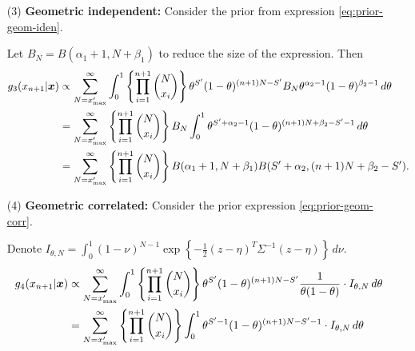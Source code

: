 {{\begin{enumerate}
        \item[(3)] {\bf Geometric independent:} Consider the prior from
        expression \ref{eq:prior-geom-iden}. 

        Let $B_N = B(\alpha_1+1,N+\beta_1)$ to reduce the size of the
        expression. Then
        \begin{equation*}
            \begin{split}
                g_3(x_{n+1}|\boldsymbol{x}) &\propto \sum_{N=x'_{\max}}^{\infty} \int_0^1 \left\{\prod_{i=1}^{n+1}\binom{N}{x_i}\right\}\theta^{S'}(1-\theta)^{(n+1)N-S'}B_N\theta^{\alpha_2-1}(1-\theta)^{\beta_2-1} \,d\theta \\
                &= \sum_{N=x'_{\max}}^{\infty} \left\{\prod_{i=1}^{n+1}\binom{N}{x_i}\right\}  B_N \int_0^1 \theta^{S'+\alpha_2-1}(1-\theta)^{(n+1)N+\beta_2-S'-1} \, d\theta \\
                &= \sum_{N=x'_{\max}}^{\infty} \left\{\prod_{i=1}^{n+1}\binom{N}{x_i}\right\} B(\alpha_1 + 1, N + \beta_1) B(S' + \alpha_2, (n+1)N + \beta_2 - S'). 
            \end{split}
        \end{equation*}
        
        \item[(4)] {\bf Geometric correlated:} Consider the prior expression
        \ref{eq:prior-geom-corr}. 
        
        Denote $I_{\theta, N} = \int_0^1
        (1-\nu)^{N-1}\exp\left\{-\frac{1}{2}(z -
        \eta)^T\Sigma^{-1}(z-\eta)\right\} \, d\nu$. 
        \begin{equation*}
            \begin{split}
                g_4(x_{n+1}|\boldsymbol{x}) &\propto \sum_{N=x'_{\max}}^{\infty} \int_0^1 \left\{\prod_{i=1}^{n+1}\binom{N}{x_i}\right\}\theta^{S'}(1-\theta)^{(n+1)N-S'} \frac{1}{\theta(1-\theta)} \cdot I_{\theta, N} \, d\theta\\ 
                &= \sum_{N=x'_{\max}}^{\infty} \left\{\prod_{i=1}^{n+1}\binom{N}{x_i}\right\} \int_0^1 \theta^{S'-1}(1-\theta)^{(n+1)N-S'-1} \cdot I_{\theta, N} \, d\theta   
            \end{split}
        \end{equation*} 
    \end{enumerate}
}
}


\vspace{2ex}